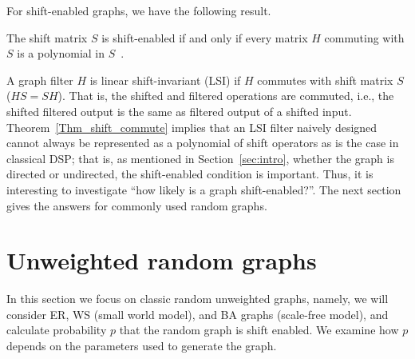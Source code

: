 \documentclass[journal]{IEEEtran}
\begin{document}








For shift-enabled graphs, we have the following result.
\begin{Thm}{\label{Thm_shift_commute}}
	The shift matrix $S$ is shift-enabled if and only if every matrix $H$ commuting with $S$ is a polynomial in $S$\rm~{\cite{sandryhaila_2013_discrete}}.
\end{Thm}
A graph filter $H$ is linear shift-invariant (LSI) if $H$ commutes with shift matrix $S$  ($HS=SH$).
That is, the shifted and filtered operations are commuted, i.e., the shifted filtered output is the same as filtered output of a shifted input. 
Theorem~\ref{Thm_shift_commute} implies that 
an LSI filter naively designed cannot always be represented as a polynomial of shift
operators as is the case in classical DSP; that is, as mentioned in Section~\ref{sec:intro}, whether the graph is directed or undirected, the shift-enabled condition is important. Thus, it is interesting to investigate ``how likely is a graph shift-enabled?''. The next section gives the answers for commonly used random graphs.

\section{Unweighted random graphs}
\label{sec:method}
In this section we focus on classic random unweighted graphs, namely,
we will consider ER, WS (small world model), and BA graphs (scale-free model), and calculate probability $p$ that the random graph is shift enabled. We examine how $p$ depends on the parameters used to generate the graph.
\end{document}
